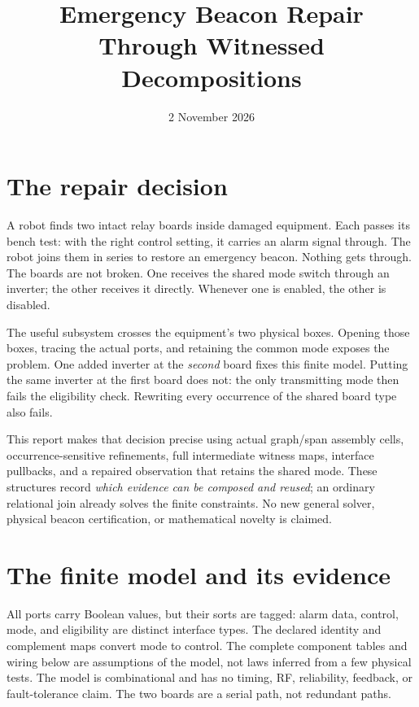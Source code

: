 \documentclass[11pt]{article}
\title{Emergency Beacon Repair Through Witnessed Decompositions}
\date{2 November 2026}
\begin{document}
\maketitle

\section*{The repair decision}

A robot finds two intact relay boards inside damaged equipment. Each passes its
bench test: with the right control setting, it carries an alarm signal through.
The robot joins them in series to restore an emergency beacon. Nothing gets
through. The boards are not broken. One receives the shared mode switch through
an inverter; the other receives it directly. Whenever one is enabled, the other
is disabled.

The useful subsystem crosses the equipment's two physical boxes. Opening those
boxes, tracing the actual ports, and retaining the common mode exposes the
problem. One added inverter at the \emph{second} board fixes this finite model.
Putting the same inverter at the first board does not: the only transmitting
mode then fails the eligibility check. Rewriting every occurrence of the shared
board type also fails.

This report makes that decision precise using actual graph/span assembly cells,
occurrence-sensitive refinements, full intermediate witness maps, interface
pullbacks, and a repaired observation that retains the shared mode. These
structures record \emph{which evidence can be composed and reused}; an ordinary
relational join already solves the finite constraints. No new general solver,
physical beacon certification, or mathematical novelty is claimed.

\section{The finite model and its evidence}

All ports carry Boolean values, but their sorts are tagged: alarm data, control,
mode, and eligibility are distinct interface types. The declared identity and
complement maps convert mode to control. The complete component tables and
wiring below are assumptions of the model, not laws inferred from a few physical
tests. The model is combinational and has no timing, RF, reliability, feedback,
or fault-tolerance claim. The two boards are a serial path, not redundant paths.
\end{document}
